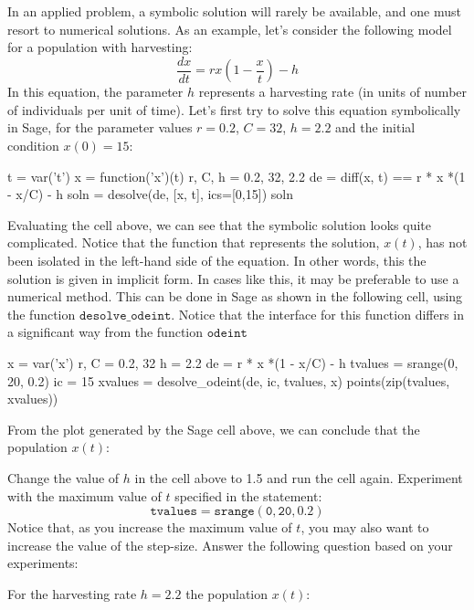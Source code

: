 \documentclass{ximera}
\begin{document}
In an applied problem, a symbolic solution will rarely be available, and one must resort to numerical solutions. As an example, let's consider the following model for a population with harvesting:
\[
\frac{dx}{dt}=rx\left(1-\frac{x}{t}\right)-h
\]
In this equation, the parameter $h$ represents a harvesting rate (in units of number of individuals per unit of time). Let's first try to solve this equation symbolically in Sage, for the parameter values $r=0.2$, $C=32$, $h=2.2$ and  the initial condition $x(0)=15$:

\begin{sageCell}
t = var('t')
x = function('x')(t)
r, C, h = 0.2, 32, 2.2
de = diff(x, t) == r * x *(1 - x/C) - h
soln = desolve(de, [x, t], ics=[0,15])
soln
\end{sageCell}

Evaluating the cell above, we can see that the symbolic solution looks quite complicated. Notice that the function that represents the solution, $x(t)$, has not been isolated in the left-hand side of the equation. In other words, this the solution is given in implicit form. In cases like this, it may be preferable to use a numerical method. This can be done in Sage as shown in the following cell, using the function $\mathtt{desolve\_odeint}$. Notice that the interface for this function differs in a significant way from the function $\mathtt{odeint}$

\begin{sageCell}
x = var('x')
r, C = 0.2, 32
h = 2.2
de = r * x *(1 - x/C) - h
tvalues = srange(0, 20, 0.2)
ic = 15
xvalues = desolve_odeint(de, ic, tvalues, x)
points(zip(tvalues, xvalues))
\end{sageCell}

\begin{problem} From the plot generated by the Sage cell above, we can conclude that the population $x(t)$:
\begin{multipleChoice}
\end{multipleChoice}
\end{problem}

\begin{problem} 
Change the value of $h$ in the cell above to 1.5 and run the cell again. Experiment with the maximum value of $t$ specified in the statement:
\[
\mathtt{tvalues = srange(0, 20, 0.2)}
\]
Notice that, as you increase the maximum value of $t$, you may also want to increase the value of the step-size. Answer the following question based on your experiments:

For the harvesting rate $h=2.2$ the population $x(t)$:
\begin{multipleChoice}
\end{multipleChoice}
\end{problem}
\end{document}
